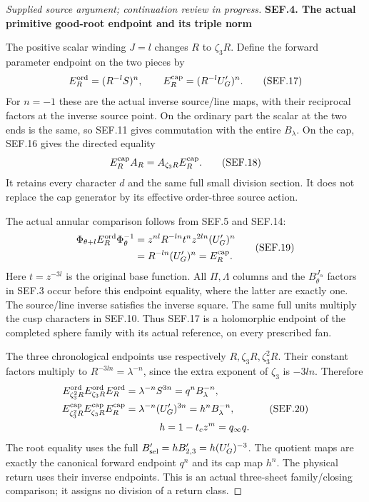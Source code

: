\begin{proof}[Supplied source argument; continuation review in progress]
\par

\medskip\noindent\textbf{SEF.4. The actual primitive good-root endpoint and its triple norm}

\par\nobreak

The positive scalar winding \(J=l\) changes \(R\) to \(\zeta_3R\).
Define the forward parameter endpoint on the two pieces by
\[
 E_R^{\rm ord}=(R^{-l}S)^n,\qquad
 E_R^{\rm cap}=(R^{-l}U'_G)^n .
 \tag{SEF.17}
\]
For \(n=-1\) these are the actual inverse source/line maps, with
their reciprocal factors at the inverse source point. On the
ordinary part the scalar at the two ends is the same, so SEF.11
gives commutation with the entire \(B_\lambda\). On the cap,
SEF.16 gives the directed equality
\[
                 E_R^{\rm cap} A_R=A_{\zeta_3R}E_R^{\rm cap}.
 \tag{SEF.18}
\]
It retains every character \(d\) and the same full small division
section. It does not replace the cap generator by its effective
order-three source action.

The actual annular comparison follows from SEF.5 and SEF.14:
\[
 \begin{split}
 \Phi_{\theta+l}E_R^{\rm ord}\Phi_\theta^{-1}
 &=z^{nl}R^{-ln}t^n z^{2ln}(U'_G)^n\\
 &=R^{-ln}(U'_G)^n=E_R^{\rm cap}.
 \end{split}                                                    \tag{SEF.19}
\]
Here \(t=z^{-3l}\) is the original base function. All \(\Pi,\Lambda\)
columns and the \(B_\theta^{J_\alpha}\) factors in SEF.3 occur
before this endpoint equality, where the latter are exactly one.
The source/line inverse satisfies the inverse square. The same
full units multiply the cusp characters in SEF.10. Thus SEF.17 is
a holomorphic endpoint of the completed sphere family with its
actual reference, on every prescribed fan.

The three chronological endpoints use respectively
\(R,\zeta_3R,\zeta_3^2R\). Their constant factors multiply to
\(R^{-3ln}=\lambda^{-n}\), since the extra exponent of \(\zeta_3\)
is \(-3ln\). Therefore
\[
 \begin{split}
 E_{\zeta_3^2R}^{\rm ord}
 E_{\zeta_3R}^{\rm ord}E_R^{\rm ord}
   &=\lambda^{-n}S^{3n}
     =q^n B_\lambda^{-n},\\
 E_{\zeta_3^2R}^{\rm cap}
 E_{\zeta_3R}^{\rm cap}E_R^{\rm cap}
   &=\lambda^{-n}(U'_G)^{3n}
     =h^n B_\lambda^{-n},\\
 &\hspace{12mm}h=1-t_cz^m=q_\infty q .
 \end{split}                                                    \tag{SEF.20}
\]
The root equality uses the full
\(B'_{\rm sel}=h B'_{2,3}=h(U'_G)^{-3}\).
The quotient maps are exactly the canonical forward endpoint
\(q^n\) and its cap map \(h^n\). The physical return uses their
inverse endpoints. This is an actual three-sheet family/closing
comparison; it assigns no division of a return class.


\end{proof}
